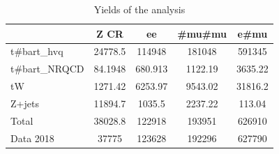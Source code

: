 \documentclass[10pt]{article}
\begin{document}
\begin{table}[htbp]
\begin{center}
\begin{tabular}{|l|S|S|S|S|}
\hline 
 & {Z CR} & {ee} & {#mu#mu} & {e#mu}\\
\hline 
  t#bar{t}_{hvq}   & 24778.5  & 114948  & 181048  & 591345  \\ 
  t#bar{t}_{NRQCD}   & 84.1948  & 680.913  & 1122.19  & 3635.22  \\ 
  tW   & 1271.42  & 6253.97  & 9543.02  & 31816.2  \\ 
  Z+jets   & 11894.7  & 1035.5  & 2237.22  & 113.04  \\ 
\hline 
  Total  & 38028.8  & 122918  & 193951  & 626910  \\ 
\hline 
  Data 2018   & 37775 & 123628 & 192296 & 627790 \\ 
\hline 
\end{tabular} 
\caption{Yields of the analysis} 
\end{center} 
\end{table} 
\end{document}
